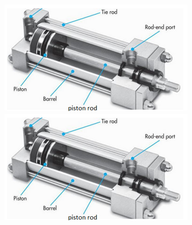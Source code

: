 \begin{figure}[h]
  \begin{center}
    \includegraphics[scale = 1]{img/Picture10.png}
  \end{center}
    \begin{center}
        \includegraphics[scale = 1]{img/Picture10.png}
    \end{center}
\end{figure}

